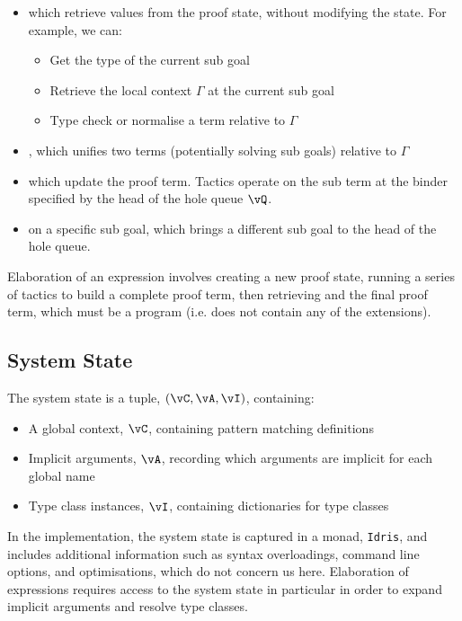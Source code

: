 \begin{itemize}
\item {} which retrieve values from the proof state, without modifying
the state. For example, we can:
\begin{itemize}
\item Get the type of the current sub goal
\item Retrieve the local context $\Gamma$ at the current sub goal
\item Type check or normalise a term relative to $\Gamma$
\end{itemize}
\item {}, which unifies two terms (potentially solving sub goals) 
relative to $\Gamma$
\item {} which update the proof term. Tactics operate on the sub term
at the binder specified by the head of the hole queue $\vQ$.
\item {} on a specific sub goal, which brings a different sub goal to the
head of the hole queue.
\end{itemize}

Elaboration of an \Idris{} expression involves creating a new proof state, running
a series of tactics to build a complete proof term, then retrieving and 
the final proof term, which must be a \TT{} program (i.e. does not contain any of the
\TTdev{} extensions).

\subsection{System State}

The system state is a tuple, $(\vC,\vA,\vI)$, containing:

\begin{itemize}
\item A global context, $\vC$, containing pattern matching definitions
\item Implicit arguments, $\vA$, recording which arguments are implicit for each global name
\item Type class instances, $\vI$, containing dictionaries for type classes
\end{itemize}

In the implementation, the system state is captured in a monad, \texttt{Idris}, and
includes additional information such as syntax overloadings,
command line options, and optimisations, which do not concern us here. Elaboration
of expressions requires access to the system state in particular in order to expand
implicit arguments and resolve type classes. 

